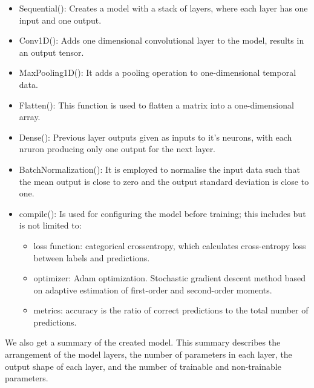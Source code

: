 \firmlist
\begin{itemize}
	\item Sequential(): Creates a model with a stack of layers, where each layer has one input and one output.
	\item Conv1D(): Adds one dimensional convolutional layer to the model, results in an output tensor.
	\item MaxPooling1D(): It adds a pooling operation to one-dimensional temporal data.
	\item Flatten(): This function is used to flatten a matrix into a one-dimensional array.
	\item Dense(): Previous layer outputs given as inputs to it's neurons, with each nruron producing only one output for the next layer.
	\item BatchNormalization(): It is employed to normalise the input data such that the mean output is close to zero and the output standard deviation is close to one.
	\item compile(): Is used for configuring the model before training; this includes but is not limited to:
		\firmlist
		\begin{itemize}
			\item loss function: categorical crossentropy, which calculates cross-entropy loss between labels and predictions.
			\item optimizer: Adam optimization. Stochastic gradient descent method based on adaptive estimation of first-order and second-order moments.
			\item metrics: accuracy is the ratio of correct predictions to the total number of predictions.
		\end{itemize}
\end{itemize}


We also get a summary of the created model. This summary describes the arrangement of the model layers, the number of parameters in each layer, the output shape of each layer, and the number of trainable and non-trainable parameters.



\newpage


